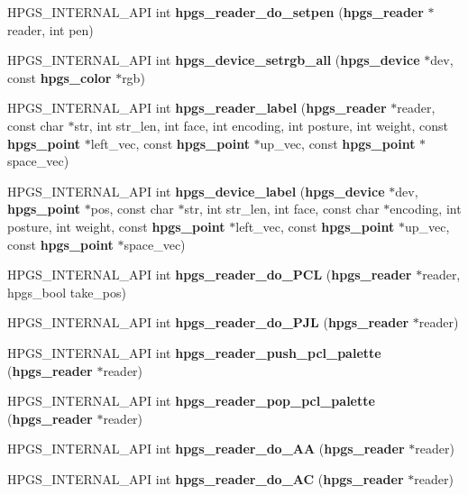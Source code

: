 \begin{CompactItemize}
\item 
HPGS\_\-INTERNAL\_\-API int \textbf{hpgs\_\-reader\_\-do\_\-setpen} ({\bf hpgs\_\-reader} $\ast$reader, int pen)\label{group__reader_gec59e9a64adea9ff35c300bdcdf71ede}

\item 
HPGS\_\-INTERNAL\_\-API int {\bf hpgs\_\-device\_\-setrgb\_\-all} ({\bf hpgs\_\-device} $\ast$dev, const {\bf hpgs\_\-color} $\ast$rgb)
\item 
HPGS\_\-INTERNAL\_\-API int \textbf{hpgs\_\-reader\_\-label} ({\bf hpgs\_\-reader} $\ast$reader, const char $\ast$str, int str\_\-len, int face, int encoding, int posture, int weight, const {\bf hpgs\_\-point} $\ast$left\_\-vec, const {\bf hpgs\_\-point} $\ast$up\_\-vec, const {\bf hpgs\_\-point} $\ast$space\_\-vec)\label{group__reader_gc6c23c56f2bee0cabc2492a6438abcda}

\item 
HPGS\_\-INTERNAL\_\-API int \textbf{hpgs\_\-device\_\-label} ({\bf hpgs\_\-device} $\ast$dev, {\bf hpgs\_\-point} $\ast$pos, const char $\ast$str, int str\_\-len, int face, const char $\ast$encoding, int posture, int weight, const {\bf hpgs\_\-point} $\ast$left\_\-vec, const {\bf hpgs\_\-point} $\ast$up\_\-vec, const {\bf hpgs\_\-point} $\ast$space\_\-vec)\label{group__reader_gfd1779b4aa12943dfa10be814af2e3dd}

\item 
HPGS\_\-INTERNAL\_\-API int {\bf hpgs\_\-reader\_\-do\_\-PCL} ({\bf hpgs\_\-reader} $\ast$reader, hpgs\_\-bool take\_\-pos)
\item 
HPGS\_\-INTERNAL\_\-API int {\bf hpgs\_\-reader\_\-do\_\-PJL} ({\bf hpgs\_\-reader} $\ast$reader)
\item 
HPGS\_\-INTERNAL\_\-API int \textbf{hpgs\_\-reader\_\-push\_\-pcl\_\-palette} ({\bf hpgs\_\-reader} $\ast$reader)\label{group__reader_g294cc9935b4d62e164171d27c0d81075}

\item 
HPGS\_\-INTERNAL\_\-API int \textbf{hpgs\_\-reader\_\-pop\_\-pcl\_\-palette} ({\bf hpgs\_\-reader} $\ast$reader)\label{group__reader_ge17b8b5957ffe80f51220b6efbe8e6f2}

\item 
HPGS\_\-INTERNAL\_\-API int \textbf{hpgs\_\-reader\_\-do\_\-AA} ({\bf hpgs\_\-reader} $\ast$reader)\label{group__reader_g9a0a45b19f07f96bef55ddee09cdeea2}

\item 
HPGS\_\-INTERNAL\_\-API int \textbf{hpgs\_\-reader\_\-do\_\-AC} ({\bf hpgs\_\-reader} $\ast$reader)\label{group__reader_g20467dca742ce723837376425e024f8d}


\end{CompactItemize}
